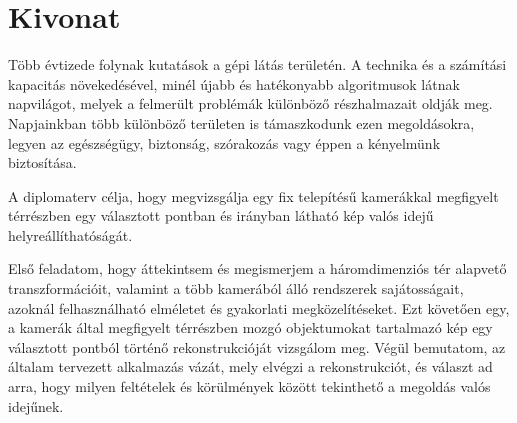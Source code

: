 \chapter*{Kivonat}

Több évtizede folynak kutatások a gépi látás területén. A technika és a számítási kapacitás növekedésével, minél újabb és hatékonyabb algoritmusok látnak napvilágot, melyek a felmerült problémák különböző részhalmazait oldják meg. Napjainkban több különböző területen is támaszkodunk ezen megoldásokra, legyen az egészségügy, biztonság, szórakozás vagy éppen a kényelmünk biztosítása.

A diplomaterv célja, hogy megvizsgálja egy fix telepítésű kamerákkal megfigyelt térrészben egy választott pontban és irányban látható kép valós idejű helyreállíthatóságát.

Első feladatom, hogy áttekintsem és megismerjem a háromdimenziós tér alapvető transzformációit, valamint a több kamerából álló rendszerek sajátosságait, azoknál felhasználható elméletet és gyakorlati megközelítéseket. Ezt követően egy, a kamerák által megfigyelt térrészben mozgó objektumokat tartalmazó kép egy választott pontból történő rekonstrukcióját vizsgálom meg. Végül bemutatom, az általam tervezett alkalmazás vázát, mely elvégzi a rekonstrukciót, és választ ad arra, hogy milyen feltételek és körülmények között tekinthető a megoldás valós idejűnek.

\vfill



